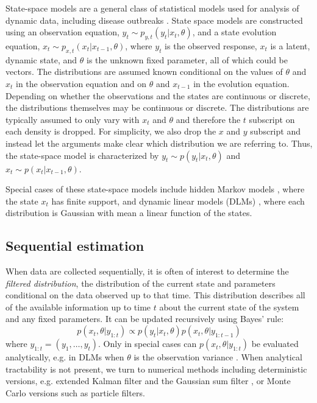 \documentclass[useAMS,referee,usenatbib]{biom}
\begin{document}
State-space models are a general class of statistical models used for analysis of dynamic data, including disease outbreaks \citep{Mart:Cone:Lope:Lope:baye:2008,watkins2009disease,merl2009statistical,ludkovski2010optimal,skvortsov2012monitoring}.  State space models are constructed using an observation equation, $y_t \sim p_{y,t}(y_t|x_t,\theta)$, and a state evolution equation, $x_t \sim p_{x,t}(x_t|x_{t-1},\theta)$, where $y_t$ is the observed response, $x_t$ is a latent, dynamic state, and $\theta$ is the unknown fixed parameter, all of which could be vectors. The distributions are assumed known conditional on the values of $\theta$ and $x_t$ in the observation equation and on $\theta$ and $x_{t-1}$ in the evolution equation. Depending on whether the observations and the states are continuous or discrete, the distributions themselves may be continuous or discrete. The distributions are typically assumed to only vary with $x_t$ and $\theta$ and therefore the $t$ subscript on each density is dropped.
For simplicity, we also drop the $x$ and $y$ subscript and instead let the arguments make clear which distribution we are referring to. Thus, the state-space model is characterized by $y_t \sim p(y_t|x_t,\theta)$ and $x_t \sim p(x_t|x_{t-1},\theta)$.

Special cases of these state-space models include hidden Markov models \citep{cappe2005inference}, where the state $x_t$ has finite support, and dynamic linear models (DLMs) \citep{West:Harr:baye:1997}, where each distribution is Gaussian with mean a linear function of the states.

\subsection{Sequential estimation}

When data are collected sequentially, it is often of interest to determine the \emph{filtered distribution}, the distribution of the current state and parameters conditional on the data observed up to that time. This distribution describes all of the available information up to time $t$ about the current state of the system and any fixed parameters. It can be updated recursively using Bayes' rule:
\begin{equation}
p(x_t,\theta| y_{1:t}) \propto p(y_t|x_t,\theta)p(x_t,\theta|y_{1:t-1}) \label{eqn:filtered}
\end{equation}
where $y_{1:t} = (y_1,\ldots,y_t)$. Only in special cases can $p(x_t,\theta| y_{1:t})$ be evaluated analytically, e.g. in DLMs when $\theta$ is the observation variance \cite[Sec 4.3,][]{petris2009dynamic}. When analytical tractability is not present, we turn to numerical methods including deterministic versions, e.g. extended Kalman filter and the Gaussian sum filter \citep{Alsp:Sore:nonl:1972}, or Monte Carlo versions such as particle filters.
\end{document}
